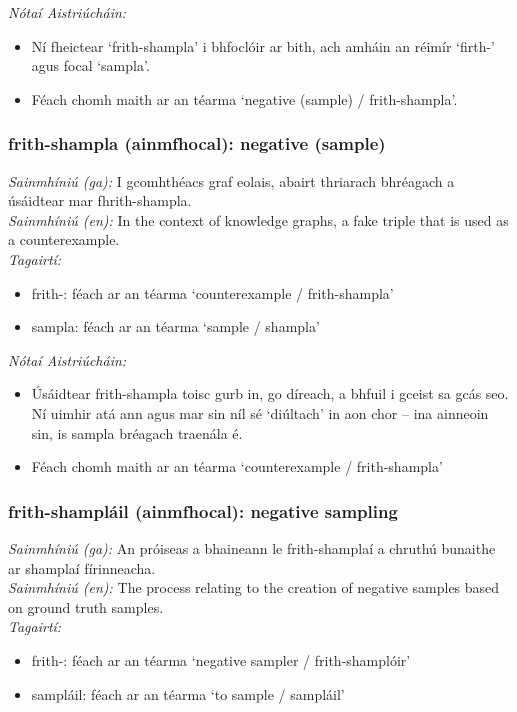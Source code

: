 \documentclass{article}
\begin{document}
 \noindent \textit{Nótaí Aistriúcháin:}
\begin{itemize}
	\item Ní fheictear `frith-shampla' i bhfoclóir ar bith, ach amháin an réimír `firth-' agus focal `sampla'.
	\item Féach chomh maith ar an téarma `negative (sample) / frith-shampla'.
\end{itemize}


\subsubsection*{frith-shampla (ainmfhocal): negative (sample)}
 \noindent \textit{Sainmhíniú (ga):} I gcomhthéacs graf eolais, abairt thriarach bhréagach a úsáidtear mar fhrith-shampla.
\\
 \noindent \textit{Sainmhíniú (en):} In the context of knowledge graphs, a fake triple that is used as a counterexample.
\\
 \noindent \textit{Tagairtí:}
\begin{itemize}
	\item frith-: féach ar an téarma `counterexample / frith-shampla'
	\item sampla: féach ar an téarma `sample / shampla'
\end{itemize}

 \noindent \textit{Nótaí Aistriúcháin:}
\begin{itemize}
	\item Úsáidtear frith-shampla toisc gurb in, go díreach, a bhfuil i gceist sa gcás seo. Ní uimhir atá ann agus mar sin níl sé `diúltach' in aon chor -- ina ainneoin sin, is sampla bréagach traenála é.
	\item Féach chomh maith ar an téarma `counterexample / frith-shampla'
\end{itemize}


\subsubsection*{frith-shampláil (ainmfhocal): negative sampling}
 \noindent \textit{Sainmhíniú (ga):} An próiseas a bhaineann le frith-shamplaí a chruthú bunaithe ar shamplaí fírinneacha.
\\
 \noindent \textit{Sainmhíniú (en):} The process relating to the creation of negative samples based on ground truth samples.
\\
 \noindent \textit{Tagairtí:}
\begin{itemize}
	\item frith-: féach ar an téarma `negative sampler / frith-shamplóir'
	\item sampláil: féach ar an téarma `to sample / sampláil'
\end{itemize}
\end{document}
